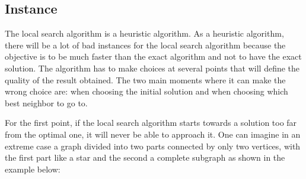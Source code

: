 
\subsection{Instance}

The local search algorithm is a heuristic algorithm. As a heuristic algorithm, there will 
be a lot of bad instances for the local search algorithm because the objective is to be 
much faster than the exact algorithm and not to have the exact solution. The algorithm has 
to make choices at several points that will define the quality of the result obtained. The 
two main moments where it can make the wrong choice are: when choosing the initial solution 
and when choosing which best neighbor to go to.
\bigskip

For the first point, if the local search algorithm starts towards a solution too far 
from the optimal one, it will never be able to approach it.
\newpage
One can imagine in an extreme 
case a graph divided into two parts connected by only two vertices, with the first part like 
a star and the second a complete subgraph as shown in the example below:

